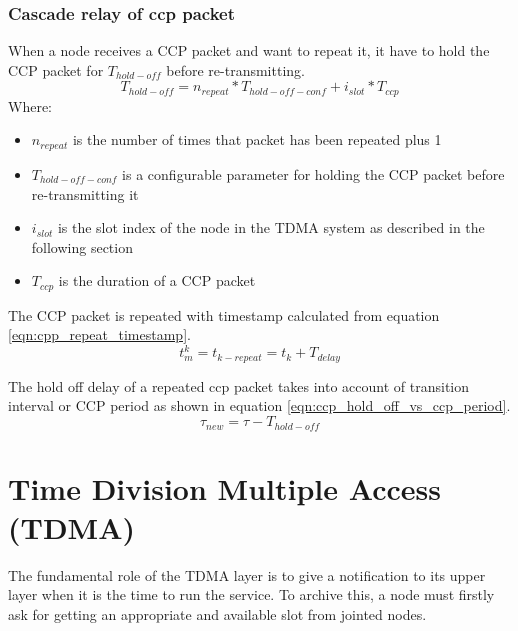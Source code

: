 \documentclass[\main/main.tex]{subfiles}
\begin{document}
\subsubsection{Cascade relay of ccp packet}
When a node receives a CCP packet and want to repeat it, it have to hold the CCP packet for $T_{hold-off}$ before re-transmitting.
\begin{equation}
    T_{hold-off} = n_{repeat}*T_{hold-off-conf} + i_{slot}*T_{ccp}
\end{equation}
Where:
\begin{itemize}
    \item $n_{repeat}$ is the number of times that packet has been repeated plus 1
    \item $T_{hold-off-conf}$ is a configurable parameter for holding the CCP packet before re-transmitting it
    \item $i_{slot}$ is the slot index of the node in the TDMA system as described in the following section
    \item  $T_{ccp}$ is the duration of a CCP packet
\end{itemize}

The CCP packet is repeated with timestamp calculated from equation \ref{eqn:cpp_repeat_timestamp}.
\begin{equation}
    t^k_m = t_{k-repeat} = t_k + T_{delay}
    \label{eqn:cpp_repeat_timestamp}
\end{equation}

The hold off delay of a repeated ccp packet takes into account of transition interval or CCP period as shown in equation \ref{eqn:ccp_hold_off_vs_ccp_period}.
\begin{equation}
    \tau_{new} = \tau - T_{hold-off}
    \label{eqn:ccp_hold_off_vs_ccp_period}
\end{equation}

\section{Time Division Multiple Access (TDMA)}
The fundamental role of the TDMA layer is to give a notification to its upper layer when it is the time to run the service. To archive this, a node must firstly ask for getting an appropriate and available slot from jointed nodes.
\end{document}

